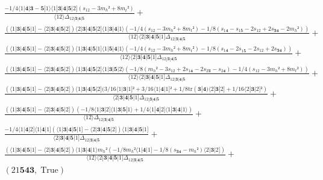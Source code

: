 \documentclass[varwidth, border=5pt]{standalone}
\newcommand{\tr}{\text{tr}}
\begin{document}
\begin{my}
$\begin{gathered}
\scriptscriptstyle\frac{-1/4⟨1|𝟒|𝟑-𝟓|1⟩⟨1|𝟑|𝟒|𝟓|2](s_{12}-3m_h²+8m_t²)}{⟨12⟩Δ_{12|𝟑|𝟒|𝟓}} +\\
\scriptscriptstyle\frac{(⟨1|𝟑|𝟒|𝟓|1]-⟨2|𝟑|𝟒|𝟓|2])⟨2|𝟑|𝟒|𝟓|2]⟨1|𝟑|𝟒|1⟩(-1/4(s_{12}-3m_h²+8m_t²)-1/8(s_{1𝟒}-s_{1𝟓}-2s_{12}+2s_{𝟑𝟒}-2m_h²))}{⟨12⟩⟨2|𝟑|𝟒|𝟓|1]Δ_{12|𝟑|𝟒|𝟓}} +\\
\scriptscriptstyle\frac{(⟨1|𝟑|𝟒|𝟓|1]-⟨2|𝟑|𝟒|𝟓|2])⟨1|𝟑|𝟒|𝟓|1]⟨1|𝟓|𝟒|1⟩(-1/4(s_{12}-3m_h²+8m_t²)-1/8(s_{1𝟒}-2s_{1𝟓}-2s_{12}+2s_{𝟑𝟒}))}{⟨12⟩⟨2|𝟑|𝟒|𝟓|1]Δ_{12|𝟑|𝟒|𝟓}} +\\
\scriptscriptstyle\frac{(⟨1|𝟑|𝟒|𝟓|1]-⟨2|𝟑|𝟒|𝟓|2])⟨1|𝟑|𝟒|𝟓|2]⟨1|𝟑|𝟓|2⟩(-1/8(m_h²-3s_{12}+2s_{1𝟒}-2s_{2𝟑}-s_{2𝟒})-1/4(s_{12}-3m_h²+8m_t²))}{⟨12⟩⟨2|𝟑|𝟒|𝟓|1]Δ_{12|𝟑|𝟒|𝟓}} +\\
\scriptscriptstyle\frac{(⟨1|𝟑|𝟒|𝟓|1]-⟨2|𝟑|𝟒|𝟓|2])⟨1|𝟑|𝟒|𝟓|2](3/16⟨1|𝟑|1]²+3/16⟨1|𝟒|1]²+1/8\tr(𝟑|𝟒)⟨2|𝟑|2]+1/16⟨2|𝟑|2]²)}{⟨2|𝟑|𝟒|𝟓|1]Δ_{12|𝟑|𝟒|𝟓}} +\\
\scriptscriptstyle\frac{(⟨1|𝟑|𝟒|𝟓|1]-⟨2|𝟑|𝟒|𝟓|2])(-1/8⟨1|𝟑|2]⟨1|𝟑|𝟓|1⟩+1/4⟨1|𝟒|2]⟨1|𝟑|𝟒|1⟩)}{⟨12⟩Δ_{12|𝟑|𝟒|𝟓}} +\\
\scriptscriptstyle\frac{-1/4⟨1|𝟒|2]⟨1|𝟒|1](⟨1|𝟑|𝟒|𝟓|1]-⟨2|𝟑|𝟒|𝟓|2])⟨1|𝟑|𝟒|𝟓|1]}{⟨2|𝟑|𝟒|𝟓|1]Δ_{12|𝟑|𝟒|𝟓}} +\\
\scriptscriptstyle\frac{(⟨1|𝟑|𝟒|𝟓|1]-⟨2|𝟑|𝟒|𝟓|2])⟨1|𝟑|𝟒|1⟩m_h²(-1/8m_h²⟨1|𝟒|1]-1/8(s_{𝟑𝟒}-m_h²)⟨2|𝟑|2])}{⟨12⟩⟨2|𝟑|𝟒|𝟓|1]Δ_{12|𝟑|𝟒|𝟓}} +\\
\scriptscriptstyle(21𝟓𝟒𝟑,\;\text{True}) \phantom{+}
\end{gathered}$
\end{my}
\end{document}
